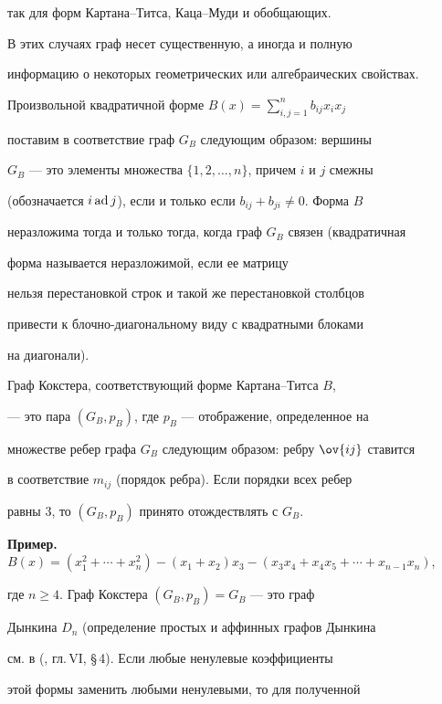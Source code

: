 так для форм Картана--Титса, Каца--Муди и обобщающих. 


В этих случаях граф несет существенную, а иногда и полную 


информацию о некоторых геометрических или алгебраических свойствах. 


 


Произвольной квадратичной форме $B(x)=\sum\limits^n_{i,j=1}b_{ij} x_i x_j$ 


поставим в соответствие граф $G_B$ следующим образом: вершины 


$G_B$ --- это элементы множества $\{1,2,\dotsc,n\}$, причем $i$ и $j$ смежны 


(обозначается $i\operatorname{ad} j$), если и только если $b_{ij}+b_{ji}\ne0$. Форма $B$ 


неразложима тогда и только тогда, когда граф $G_B$ связен (квадратичная 


форма называется неразложимой, если ее матрицу 


нельзя перестановкой строк и такой же перестановкой столбцов 


привести к блочно-диагональному виду с квадратными блоками 


на диагонали). 


 


Граф Кокстера, соответствующий форме Картана--Титса $B$, 


--- это пара $(G_B,p_B)$, где $p_B$ --- отображение, определенное на 


множестве ребер графа $G_B$ следующим образом: ребру $\ov{ij}$ ставится 


в соответствие $m_{ij}$ (порядок ребра). Если порядки всех ребер 


равны 3, то $(G_B,p_B)$ принято отождествлять с $G_B$. 


\medskip 


 


{\bf Пример.} $B(x)=(x^2_1+\dotsb+x^2_n)-(x_1+x_2)x_3-(x_3x_4+x_4x_5+ 


\dotsb+x_{n-1}x_n)$, 


где $n\ge4$. Граф Кокстера $(G_B,p_B)=G_B$ --- это граф 


Дынкина $D_n$ (определение простых и аффинных графов Дынкина 


см. в (\cite{1}, гл.\,VI, \S\,4). Если любые ненулевые коэффициенты 


этой формы заменить любыми ненулевыми, то для полученной 



